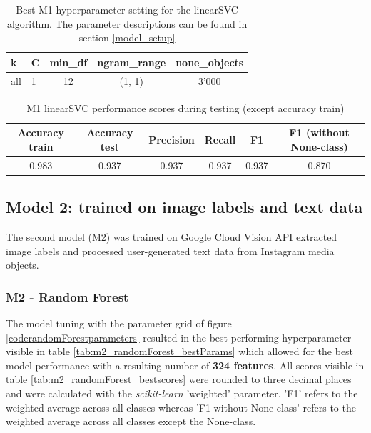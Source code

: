 \begin{table}[!htb] %
\begin{center}
\caption{Best M1 hyperparameter setting for the linearSVC algorithm. The parameter descriptions can be found in section \ref{model_setup}}\vspace{1ex}
\label{tab:m1_linearSVC_bestParams}
\begin{tabular}{llccc}\hline
k & C & min\_df & ngram\_range & none\_objects \\ \hline
all & 1 & 12 & (1, 1) & 3'000 \\ \hline
\end{tabular}
\end{center}
\end{table}

\begin{table}[!htb] %
\begin{center}
\caption{M1 linearSVC performance scores during testing (except accuracy train)}\vspace{1ex}
\label{tab:m1_linearSVC_bestscores}
\begin{tabular}{cccccc}\hline
Accuracy train & Accuracy test & Precision & Recall & F1 & F1 (without None-class)\\ \hline
0.983 & 0.937 & 0.937 & 0.937 & 0.937 & 0.870 \\ \hline
\end{tabular}
\end{center}
\end{table}

\subsection{Model 2: trained on image labels and text data}
The second model (M2) was trained on Google Cloud Vision API extracted image labels and processed user-generated text data from Instagram media objects.

\subsubsection{M2 - Random Forest}
The model tuning with the parameter grid of figure \ref{coderandomForestparameters} resulted in the best performing hyperparameter visible in table \ref{tab:m2_randomForest_bestParams} which allowed for the best model performance with a resulting number of \textbf{324 features}. All scores visible in table \ref{tab:m2_randomForest_bestscores} were rounded to three decimal places and were calculated with the \textit{scikit-learn} 'weighted' parameter. 'F1' refers to the weighted average across all classes whereas 'F1 without None-class' refers to the weighted average across all classes except the None-class.

